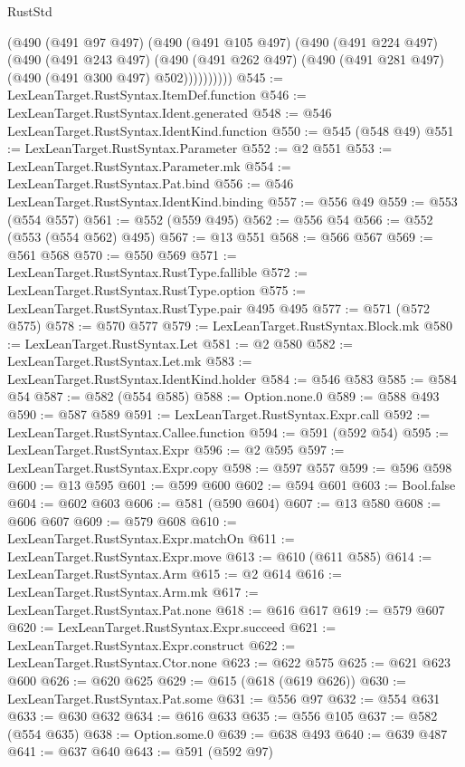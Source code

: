 \begin{lexlean}{RustStd}
\begin{coremodule}
          (@490
            (@491 @97 @497)
            (@490
              (@491 @105 @497)
              (@490
                (@491 @224 @497)
                (@490
                  (@491 @243 @497)
                  (@490
                    (@491 @262 @497)
                    (@490 (@491 @281 @497) (@490 (@491 @300 @497) @502))))))))))
@545 := LexLeanTarget.RustSyntax.ItemDef.function
@546 := LexLeanTarget.RustSyntax.Ident.generated
@548 := @546 LexLeanTarget.RustSyntax.IdentKind.function
@550 := @545 (@548 @49)
@551 := LexLeanTarget.RustSyntax.Parameter
@552 := @2 @551
@553 := LexLeanTarget.RustSyntax.Parameter.mk
@554 := LexLeanTarget.RustSyntax.Pat.bind
@556 := @546 LexLeanTarget.RustSyntax.IdentKind.binding
@557 := @556 @49
@559 := @553 (@554 @557)
@561 := @552 (@559 @495)
@562 := @556 @54
@566 := @552 (@553 (@554 @562) @495)
@567 := @13 @551
@568 := @566 @567
@569 := @561 @568
@570 := @550 @569
@571 := LexLeanTarget.RustSyntax.RustType.fallible
@572 := LexLeanTarget.RustSyntax.RustType.option
@575 := LexLeanTarget.RustSyntax.RustType.pair @495 @495
@577 := @571 (@572 @575)
@578 := @570 @577
@579 := LexLeanTarget.RustSyntax.Block.mk
@580 := LexLeanTarget.RustSyntax.Let
@581 := @2 @580
@582 := LexLeanTarget.RustSyntax.Let.mk
@583 := LexLeanTarget.RustSyntax.IdentKind.holder
@584 := @546 @583
@585 := @584 @54
@587 := @582 (@554 @585)
@588 := Option.none.{0}
@589 := @588 @493
@590 := @587 @589
@591 := LexLeanTarget.RustSyntax.Expr.call
@592 := LexLeanTarget.RustSyntax.Callee.function
@594 := @591 (@592 @54)
@595 := LexLeanTarget.RustSyntax.Expr
@596 := @2 @595
@597 := LexLeanTarget.RustSyntax.Expr.copy
@598 := @597 @557
@599 := @596 @598
@600 := @13 @595
@601 := @599 @600
@602 := @594 @601
@603 := Bool.false
@604 := @602 @603
@606 := @581 (@590 @604)
@607 := @13 @580
@608 := @606 @607
@609 := @579 @608
@610 := LexLeanTarget.RustSyntax.Expr.matchOn
@611 := LexLeanTarget.RustSyntax.Expr.move
@613 := @610 (@611 @585)
@614 := LexLeanTarget.RustSyntax.Arm
@615 := @2 @614
@616 := LexLeanTarget.RustSyntax.Arm.mk
@617 := LexLeanTarget.RustSyntax.Pat.none
@618 := @616 @617
@619 := @579 @607
@620 := LexLeanTarget.RustSyntax.Expr.succeed
@621 := LexLeanTarget.RustSyntax.Expr.construct
@622 := LexLeanTarget.RustSyntax.Ctor.none
@623 := @622 @575
@625 := @621 @623 @600
@626 := @620 @625
@629 := @615 (@618 (@619 @626))
@630 := LexLeanTarget.RustSyntax.Pat.some
@631 := @556 @97
@632 := @554 @631
@633 := @630 @632
@634 := @616 @633
@635 := @556 @105
@637 := @582 (@554 @635)
@638 := Option.some.{0}
@639 := @638 @493
@640 := @639 @487
@641 := @637 @640
@643 := @591 (@592 @97)

\end{coremodule}
\end{lexlean}
